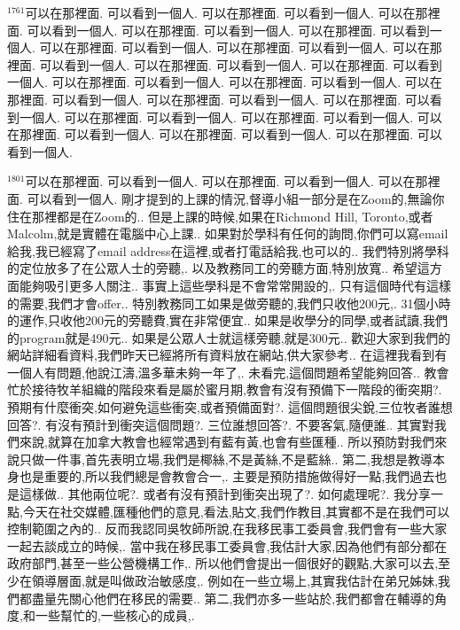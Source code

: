 \documentclass{book}
\begin{document}
$^{1761}$可以在那裡面.
可以看到一個人.
可以在那裡面.
可以看到一個人.
可以在那裡面.
可以看到一個人.
可以在那裡面.
可以看到一個人.
可以在那裡面.
可以看到一個人.
可以在那裡面.
可以看到一個人.
可以在那裡面.
可以看到一個人.
可以在那裡面.
可以看到一個人.
可以在那裡面.
可以看到一個人.
可以在那裡面.
可以看到一個人.
可以在那裡面.
可以看到一個人.
可以在那裡面.
可以看到一個人.
可以在那裡面.
可以看到一個人.
可以在那裡面.
可以看到一個人.
可以在那裡面.
可以看到一個人.
可以在那裡面.
可以看到一個人.
可以在那裡面.
可以看到一個人.
可以在那裡面.
可以看到一個人.
可以在那裡面.
可以看到一個人.
可以在那裡面.
可以看到一個人.

$^{1801}$可以在那裡面.
可以看到一個人.
可以在那裡面.
可以看到一個人.
可以在那裡面.
可以看到一個人.
剛才提到的上課的情況,督導小組一部分是在Zoom的,無論你住在那裡都是在Zoom的..
但是上課的時候,如果在Richmond Hill, Toronto,或者Malcolm,就是實體在電腦中心上課..
如果對於學科有任何的詢問,你們可以寫email給我,我已經寫了email address在這裡,或者打電話給我,也可以的..
我們特別將學科的定位放多了在公眾人士的旁聽,.
以及教務同工的旁聽方面,特別放寬..
希望這方面能夠吸引更多人關注..
事實上這些學科是不會常常開設的,.
只有這個時代有這樣的需要,我們才會offer..
特別教務同工如果是做旁聽的,我們只收他200元,.
31個小時的運作,只收他200元的旁聽費,實在非常便宜..
如果是收學分的同學,或者試讀,我們的program就是490元..
如果是公眾人士就這樣旁聽,就是300元..
歡迎大家到我們的網站詳細看資料,我們昨天已經將所有資料放在網站,供大家參考..
在這裡我看到有一個人有問題,他說江濤,溫多華未夠一年了,.
未看完,這個問題希望能夠回答..
教會忙於接待牧羊組織的階段來看是屬於蜜月期,教會有沒有預備下一階段的衝突期?.
預期有什麼衝突,如何避免這些衝突,或者預備面對?.
這個問題很尖銳,三位牧者誰想回答?.
有沒有預計到衝突這個問題?.
三位誰想回答?.
不要客氣,隨便誰..
其實對我們來說,就算在加拿大教會也經常遇到有藍有黃,也會有些匯種..
所以預防對我們來說只做一件事,首先表明立場,我們是椰絲,不是黃絲,不是藍絲..
第二,我想是教導本身也是重要的,所以我們總是會教會合一,.
主要是預防措施做得好一點,我們過去也是這樣做..
其他兩位呢?.
或者有沒有預計到衝突出現了?.
如何處理呢?.
我分享一點,今天在社交媒體,匯種他們的意見,看法,貼文,我們作教目,其實都不是在我們可以控制範圍之內的..
反而我認同吳牧師所說,在我移民事工委員會,我們會有一些大家一起去談成立的時候,.
當中我在移民事工委員會,我估計大家,因為他們有部分都在政府部門,甚至一些公營機構工作,.
所以他們會提出一個很好的觀點,大家可以去,至少在領導層面,就是叫做政治敏感度,.
例如在一些立場上,其實我估計在弟兄姊妹,我們都盡量先關心他們在移民的需要..
第二,我們亦多一些站於,我們都會在輔導的角度,和一些幫忙的,一些核心的成員,.
\end{document}
